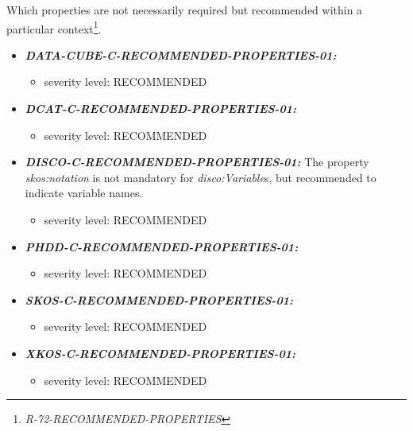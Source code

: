 \documentclass{llncs}
\begin{document}
Which properties are not necessarily required but recommended within a particular context\footnote{{\em R-72-RECOMMENDED-PROPERTIES}}.

\begin{itemize}
	\item \textbf{{\em DATA-CUBE-C-RECOMMENDED-PROPERTIES-01:}}
	\begin{itemize}
		\item severity level: RECOMMENDED
	\end{itemize}
\end{itemize}

\begin{itemize}
	\item \textbf{{\em DCAT-C-RECOMMENDED-PROPERTIES-01:}}
	\begin{itemize}
		\item severity level: RECOMMENDED
	\end{itemize}
\end{itemize}

\begin{itemize}
	\item \textbf{{\em DISCO-C-RECOMMENDED-PROPERTIES-01:}}
  The property {\em skos:notation} is not mandatory for {\em disco:Variable}s, but recommended to indicate variable names.
	\begin{itemize}
		\item severity level: RECOMMENDED
	\end{itemize}
\end{itemize}

\begin{itemize}
	\item \textbf{{\em PHDD-C-RECOMMENDED-PROPERTIES-01:}}
	\begin{itemize}
		\item severity level: RECOMMENDED
	\end{itemize}
\end{itemize}

\begin{itemize}
	\item \textbf{{\em SKOS-C-RECOMMENDED-PROPERTIES-01:}}
	\begin{itemize}
		\item severity level: RECOMMENDED
	\end{itemize}
\end{itemize}

\begin{itemize}
	\item \textbf{{\em XKOS-C-RECOMMENDED-PROPERTIES-01:}}
	\begin{itemize}
		\item severity level: RECOMMENDED
	\end{itemize}
\end{itemize}
\end{document}
